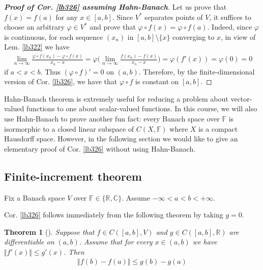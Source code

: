 \documentclass[12pt,b5paper,notitlepage]{article}
\theoremstyle{definition}
\theoremstyle{plain}
\newtheorem{thm}[df]{Theorem}
\newcommand{\Cbb}{\mathbb C}
\newcommand{\Rbb}{\mathbb R}
\newcommand{\Fbb}{\mathbb F}
\numberwithin{equation}{section}
\begin{document}
\begin{proof}[\textbf{Proof of Cor. \ref{lb326} assuming Hahn-Banach}]
Let us prove that $f(x)=f(a)$ for any $x\in[a,b]$. Since $V^*$ separates points of $V$, it suffices to choose an arbitrary $\varphi\in V^*$ and prove that $\varphi\circ f(x)=\varphi\circ f(a)$. Indeed,  since $\varphi$ is continuous, for each sequence $(x_n)$ in $[a,b]\setminus\{x\}$ converging to $x$, in view of Lem. \ref{lb322} we have
\begin{align*}
\lim_{n\rightarrow\infty}\frac{\varphi\circ f(x_n)-\varphi\circ f(x)}{x_n-x}=\varphi\Big(\lim_{n\rightarrow\infty}\frac{f(x_n)-f(x)}{x_n-x}\Big)=\varphi(f'(x))=\varphi(0)=0
\end{align*}
if $a<x<b$. Thus $(\varphi\circ f)'=0$ on $(a,b)$. Therefore, by the finite-dimensional version of Cor. \ref{lb326}, we have that $\varphi\circ f$ is constant on $[a,b]$.
\end{proof}




Hahn-Banach theorem is extremely useful for reducing a problem about vector-valued functions to one about scalar-valued functions. In this course, we will also use Hahn-Banach to prove another fun fact: every Banach space over $\Fbb$ is isormorphic to a closed linear subspace of $C(X,\Fbb)$ where $X$ is a compact Hausdorff space. However, in the following section we would like to give an elementary proof of Cor. \ref{lb326} without using Hahn-Banach. 



\subsection{Finite-increment theorem}

Fix a Banach space $V$ over $\Fbb\in\{\Rbb,\Cbb\}$. Assume $-\infty<a<b<+\infty$.

Cor. \ref{lb326} follows immediately from the following theorem by taking $g=0$.


\begin{thm}[]\label{lb329}
Suppose that $f\in C([a,b],V)$ and $g\in C([a,b],\Rbb)$ are differentiable on $(a,b)$. Assume that for every $x\in(a,b)$ we have $\Vert f'(x)\Vert\leq g'(x)$. Then
\begin{align}
\Vert f(b)-f(a)\Vert\leq g(b)-g(a)  \label{eq124}
\end{align}
\end{thm}
\end{document}
